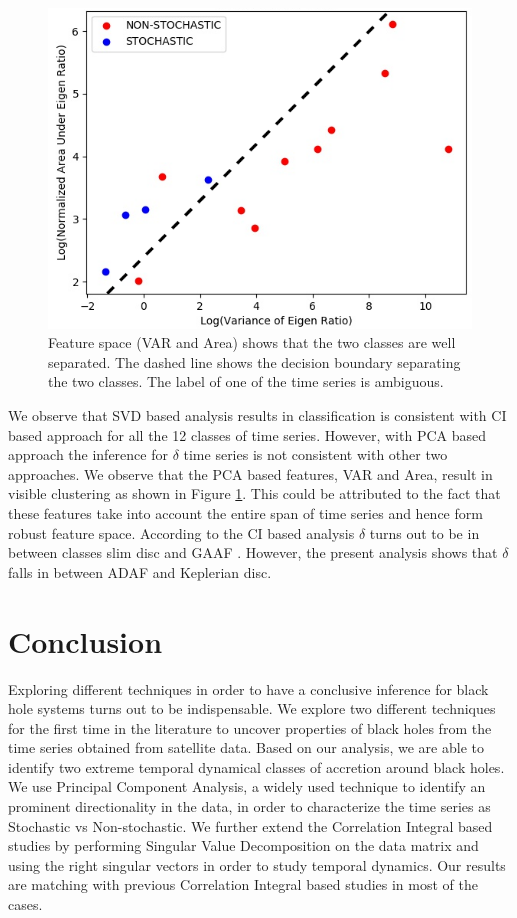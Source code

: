 \documentclass[10pt,conference]{IEEEtran}
\begin{document}
\begin{figure}
   \centering
   \includegraphics[width=.9\linewidth]{var_area_fs.drawio.png}
   \caption{Feature space (VAR and Area) shows that the two classes are well separated. The dashed line shows the decision boundary separating the two classes. The label of one of the time series is ambiguous.}
   \label{fig:variance_area_fs}
\end{figure}
We observe that SVD based analysis results in classification  is consistent with CI based approach for all the 12 classes of time series. However, with PCA based approach the inference for  $\delta$ time series is not consistent with other two approaches. We observe that the PCA based features, VAR and Area, result in visible clustering as shown in Figure \ref{fig:variance_area_fs}. This could be attributed to the fact that   these features take into account the entire span of time series and hence form robust feature space. According to the CI based analysis $\delta$ turns out to be in between classes slim disc  and GAAF \cite{Adegoke2018}. However, the present analysis shows that $\delta$ falls in between ADAF and Keplerian disc.


\section{Conclusion}
Exploring different techniques in order to have a conclusive inference for black hole systems turns out to be indispensable. We explore two different techniques for the first time in the literature to uncover  properties of black holes from the time series obtained from satellite data. Based on our analysis, we are able to identify two extreme temporal dynamical classes of accretion around black holes. We use Principal Component Analysis, a widely used technique to identify an prominent directionality in the data, in order to characterize the time series as Stochastic vs Non-stochastic. We further extend the Correlation Integral based studies by performing Singular Value Decomposition on the data matrix and using the right singular vectors in order to study temporal dynamics. Our results  are matching with previous Correlation Integral based studies in most of the cases.
\end{document}
